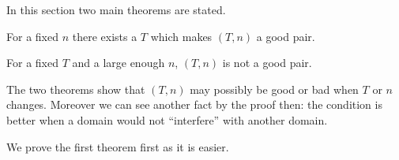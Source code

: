 In this section two main theorems are stated.

\begin{thm}
	For a fixed $n$ there exists a $T$ which makes $(T, n)$ a good pair.
\end{thm}

\begin{thm}
	For a fixed $T$ and a large enough $n$, $(T, n)$ is not a good pair.
\end{thm}

The two theorems show that $(T, n)$ may possibly be good or bad when $T$ 
or $n$ changes. Moreover we can see another fact by the proof then: the 
condition is better when a domain would not ``interfere'' with
another domain.\newline

We prove the first theorem first as it is easier.

